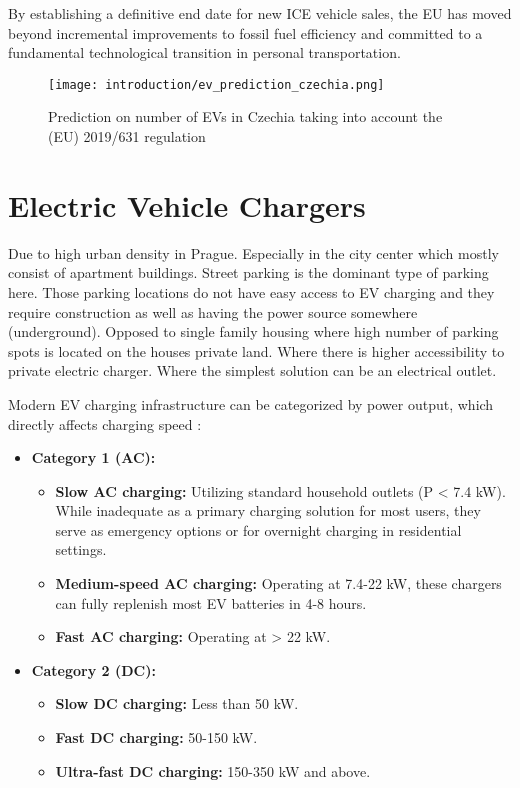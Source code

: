By establishing a definitive end date for new ICE vehicle sales, the EU has moved beyond incremental improvements to fossil fuel efficiency and committed to a fundamental technological transition in personal transportation.

\begin{figure}
    \texttt{[image: introduction/ev\_prediction\_czechia.png]}
    \caption{Prediction on number of EVs in Czechia taking into account the (EU) 2019/631 regulation }
\end{figure}

\section{Electric Vehicle Chargers}

Due to high urban density in Prague. Especially in the city center which mostly consist of apartment buildings. Street parking is the dominant type of parking here. Those parking locations do not have easy access to \acrlong{EV} charging and they require construction as well as having the power source somewhere (underground). Opposed to single family housing where high number of parking spots is located on the houses private land. Where there is higher accessibility to private electric charger. Where the simplest solution can be an electrical outlet.

Modern EV charging infrastructure can be categorized by power output, which directly affects charging speed :

\begin{itemize}
    \item \textbf{Category 1 (AC):}
          \begin{itemize}
              \item \textbf{Slow AC charging:} Utilizing standard household outlets (P < 7.4 kW). While inadequate as a primary charging solution for most users, they serve as emergency options or for overnight charging in residential settings.

              \item \textbf{Medium-speed AC charging:} Operating at 7.4-22 kW, these chargers can fully replenish most EV batteries in 4-8 hours.

              \item \textbf{Fast AC charging:} Operating at > 22 kW.
          \end{itemize}

    \item \textbf{Category 2 (DC):}
          \begin{itemize}
              \item \textbf{Slow DC charging:} Less than 50 kW.

              \item \textbf{Fast DC charging:} 50-150 kW.

              \item \textbf{Ultra-fast DC charging:} 150-350 kW and above.
          \end{itemize}
\end{itemize}

